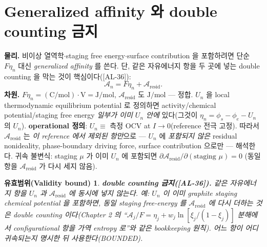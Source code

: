 \documentclass[11pt,a4paper]{article}
\newtheorem*{boundbox}{유효범위(Validity bound)}
\newcommand{\resid}{\mathrm{resid}}
\newcommand{\AL}[1]{\textsf{[AL-#1]}}
\begin{document}
\section{Generalized affinity 와 double counting 금지}\label{sec:ch3_genaff}
\textbf{물리.} 비이상 열역학$\cdot$staging free energy$\cdot$surface contribution 을 포함하려면 단순 $F\eta_n$
대신 \emph{generalized affinity} 를 쓴다. 단, 같은 자유에너지 항을 두 곳에 넣는 double counting 을 막는 것이
핵심이다(\AL{36}):
\begin{equation}
\mathcal A_n=F\eta_n+\mathcal A_{\resid}.
\label{eq:ch3_genaff}
\end{equation}
\textbf{차원.} $F\eta_n=\mathrm{(C/mol)\cdot V}=\mathrm{J/mol}$, $\mathcal A_{\resid}$ 도 $\mathrm{J/mol}$ — 정합.
$U_n$ 을 local thermodynamic equilibrium potential 로 정의하면 activity/chemical potential/staging free energy
\emph{일부가 이미 $U_n$ 안에} 있다(그것이 $\eta_n=\phi_s-\phi_e-U_n$ 의 $U_n$). \textbf{operational 정의}:
$U_n\equiv$ 측정 OCV at $I\to0$(reference 전극 고정). 따라서 $\mathcal A_{\resid}$ 는 \emph{이 reference 에서 제외된
항만}으로 — $U_n$ 에 \emph{포함되지 않은} residual nonideality, phase-boundary driving force, surface contribution
으로만 — 해석한다. 귀속 불변식: staging $\mu$ 가 이미 $U_n$ 에 포함되면 $\partial\mathcal A_{\resid}/\partial(\text{staging }\mu)=0$
(동일 항을 $\mathcal A_{\resid}$ 가 다시 세지 않음).
\begin{boundbox}
\textbf{double counting 금지(\AL{36}).} 같은 자유에너지 항을 $U_n$ 과 $\mathcal A_{\resid}$ 에 동시에 넣지
않는다. 예: $U_n$ 이 이미 graphite staging chemical potential 을 포함하면, 동일 staging free-energy 를
$\mathcal A_{\resid}$ 에 다시 더하는 것은 double counting 이다(Chapter 2 의 ``$\mathcal A_j/F=\eta_j+w_j\ln[\xi_j/(1-\xi_j)]$
분해에서 configurational 항을 가역 entropy 로''와 같은 bookkeeping 원칙). 어느 항이 어디 귀속되는지 명시한 뒤
사용한다(BOUNDED).
\end{boundbox}

\end{document}
